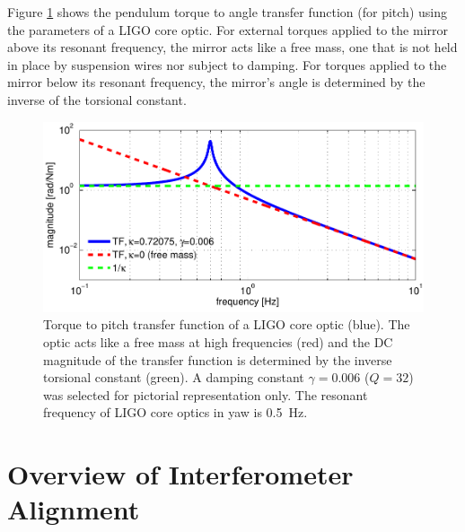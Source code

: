 Figure \ref{fig:pendTF} shows the pendulum torque to angle transfer
function (for pitch) using the parameters of a LIGO core optic. For
external torques applied to the mirror above its resonant frequency,
the mirror acts like a free mass, one that is not held in place by
suspension wires nor subject to damping. For torques applied to the
mirror below its resonant frequency, the mirror's angle is determined
by the inverse of the torsional constant.

\begin{figure}
\begin{centering}
\includegraphics[width=1.0\textwidth]{figures/pendTF.pdf}
\caption[Torque to pitch transfer function of a LIGO core
optic]{Torque to pitch transfer function of a LIGO core optic
  (blue). The optic acts like a free mass at high frequencies (red)
  and the DC magnitude of the transfer function is determined by the
  inverse torsional constant (green). A damping constant $\gamma =
  0.006$ ($Q=32$) was selected for pictorial representation only. The
  resonant frequency of LIGO core optics in yaw is 0.5~Hz.}
\label{fig:pendTF}
\end{centering}
\end{figure}





\section{Overview of Interferometer Alignment}
\label{sec:alignment_overview}

